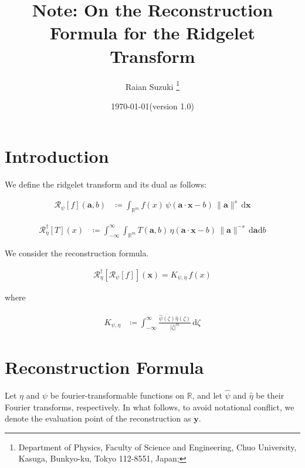 \documentclass[a4paper,12pt]{article}
\newcommand{\intinf}{\int_{-\infty}^{\infty}}
\newcommand{\intrm}{\int_{\mathbb{R}^m}}
\newcommand{\R}{\mathbb{R}}
\newcommand{\Rid}{\mathscr{R}}
\newcommand{\Ridd}{\mathscr{R}^{\dagger}}
\newcommand{\z}{\zeta}
\newcommand{\va}{\bm{a}}
\newcommand{\vx}{\bm{x}}
\newcommand{\vy}{\bm{y}}
\newcommand{\nora}{\|\bm{a}\|}
\newcommand{\absz}{|\z|}
\newcommand{\da}{\mathrm{d}\va}
\newcommand{\dx}{\mathrm{d}\vx}
\newcommand{\db}{\mathrm{d}b}
\newcommand{\dd}{\mathrm{d}}
\newcommand{\psihat}{\widehat{\psi}}
\newcommand{\etahat}{\widehat{\eta}}
\begin{document}
\title{
\bf 
Note: On the Reconstruction Formula for the Ridgelet Transform
}
\author{
Raian Suzuki
\footnote{
Department of Physics,
Faculty of Science and Engineering,
Chuo University, 
Kasuga, Bunkyo-ku, Tokyo 112-8551, Japan;
} 
}

\date{\today (version 1.0)}

\pagestyle{plain}
\maketitle

  

\clearpage

\section{Introduction}

We define the ridgelet transform and its dual as follows:

\begin{align}
  \Rid_\psi[f](\va, b) &\coloneqq \intrm f(x) \, \psi(\va \cdot \vx - b) \, \nora^s \, \dx
\end{align}

\begin{align}
  \Ridd_{\eta}[T](x) &\coloneqq \intinf \intrm  T(\va, b) \, \eta(\va \cdot \vx - b) \, \nora^{-s}\, \da \db
\end{align}

We consider the reconstruction formula.

\begin{align}
  \Ridd_{\eta}[\Rid_\psi[f]](\vx) = K_{\psi, \eta} \, f(x)
\end{align}

where 

\begin{align}
  K_{\psi, \eta} &\coloneqq \intinf \frac{\overline{\psihat(\z)}\etahat(\z)}{\absz^{m}} \, \dd \z
\end{align}

\clearpage

\section{Reconstruction Formula}

Let $\eta$ and $\psi$ be fourier-transformable functions on $\R$, and let $\psihat$ and $\etahat$ be their Fourier transforms, respectively.
In what follows, to avoid notational conflict, we denote the evaluation point of the reconstruction as $\vy$.
\end{document}
